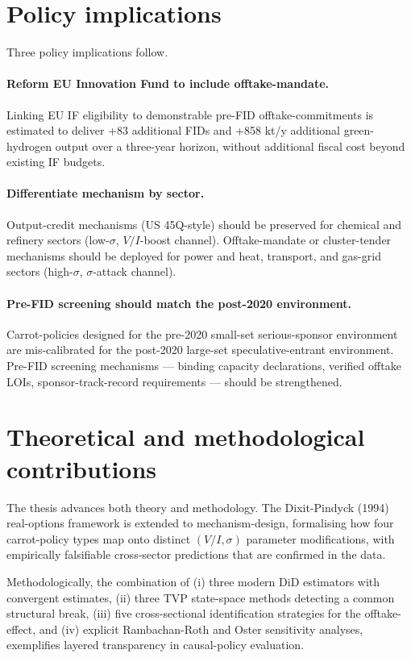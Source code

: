 \section{Policy implications}

Three policy implications follow.

\paragraph{Reform EU Innovation Fund to include offtake-mandate.} Linking EU IF eligibility to demonstrable pre-FID offtake-commitments is estimated to deliver +83 additional FIDs and +858 kt/y additional green-hydrogen output over a three-year horizon, without additional fiscal cost beyond existing IF budgets.

\paragraph{Differentiate mechanism by sector.} Output-credit mechanisms (US 45Q-style) should be preserved for chemical and refinery sectors (low-$\sigma$, $V/I$-boost channel). Offtake-mandate or cluster-tender mechanisms should be deployed for power and heat, transport, and gas-grid sectors (high-$\sigma$, $\sigma$-attack channel).

\paragraph{Pre-FID screening should match the post-2020 environment.} Carrot-policies designed for the pre-2020 small-set serious-sponsor environment are mis-calibrated for the post-2020 large-set speculative-entrant environment. Pre-FID screening mechanisms --- binding capacity declarations, verified offtake LOIs, sponsor-track-record requirements --- should be strengthened.

\section{Theoretical and methodological contributions}

The thesis advances both theory and methodology. The Dixit-Pindyck (1994) real-options framework is extended to mechanism-design, formalising how four carrot-policy types map onto distinct $(V/I, \sigma)$ parameter modifications, with empirically falsifiable cross-sector predictions that are confirmed in the data.

Methodologically, the combination of (i) three modern DiD estimators with convergent estimates, (ii) three TVP state-space methods detecting a common structural break, (iii) five cross-sectional identification strategies for the offtake-effect, and (iv) explicit Rambachan-Roth and Oster sensitivity analyses, exemplifies layered transparency in causal-policy evaluation.

